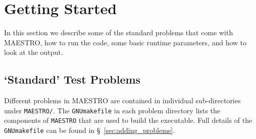 \section{Getting Started}

In this section we describe some of the standard problems that come
with MAESTRO, how to run the code, some basic runtime parameters, and
how to look at the output.

\subsection{`Standard' Test Problems}

Different problems in MAESTRO are contained in individual
sub-directories under {\tt MAESTRO/}.  The {\tt GNUmakefile}
in each problem directory lists the components of {\tt MAESTRO}
that are used to build the executable.  Full details of the
{\tt GNUmakefile} can be found in \S~\ref{sec:adding_problems}.

